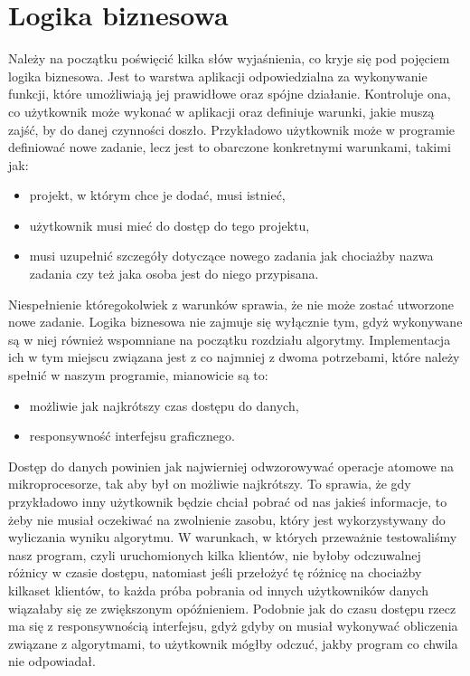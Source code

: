\section{Logika biznesowa}
\label{sec:LogikaBiznesowa}
Należy na początku poświęcić kilka słów wyjaśnienia, co kryje się pod pojęciem logika biznesowa. Jest to warstwa aplikacji odpowiedzialna za wykonywanie funkcji, które umożliwiają jej prawidłowe oraz spójne działanie. Kontroluje ona, co użytkownik może wykonać w aplikacji oraz definiuje warunki, jakie muszą zajść, by do danej czynności doszło. Przykładowo użytkownik może w programie definiować nowe zadanie, lecz jest to obarczone konkretnymi warunkami, takimi jak: 
\begin{itemize}
    \item projekt, w którym chce je dodać, musi istnieć,
    \item użytkownik musi mieć do dostęp do tego projektu,
    \item musi uzupełnić szczegóły dotyczące nowego zadania jak chociażby nazwa zadania czy też jaka osoba jest do niego przypisana.
\end{itemize}
Niespełnienie któregokolwiek z warunków sprawia, że nie może zostać utworzone nowe zadanie. Logika biznesowa nie zajmuje się wyłącznie tym, gdyż wykonywane są w niej również wspomniane na początku rozdziału algorytmy. Implementacja ich w tym miejscu związana jest z co najmniej z dwoma potrzebami, które należy spełnić w naszym programie, mianowicie są to:
\begin{itemize}
    \item możliwie jak najkrótszy czas dostępu do danych,
    \item responsywność interfejsu graficznego.
\end{itemize}
Dostęp do danych powinien jak najwierniej odwzorowywać operacje atomowe na mikroprocesorze, tak aby był on możliwie najkrótszy. To sprawia, że gdy przykładowo inny użytkownik będzie chciał pobrać od nas jakieś informacje, to żeby nie musiał oczekiwać na zwolnienie zasobu, który jest wykorzystywany do wyliczania wyniku algorytmu. W warunkach, w których przeważnie testowaliśmy nasz program, czyli uruchomionych kilka klientów, nie byłoby odczuwalnej różnicy w czasie dostępu, natomiast jeśli przełożyć tę różnicę na chociażby kilkaset klientów, to każda próba pobrania od innych użytkowników danych wiązałaby się ze zwiększonym opóźnieniem. Podobnie jak do czasu dostępu rzecz ma się z responsywnością interfejsu, gdyż gdyby on musiał wykonywać obliczenia związane z algorytmami, to użytkownik mógłby odczuć, jakby program co chwila nie odpowiadał.

